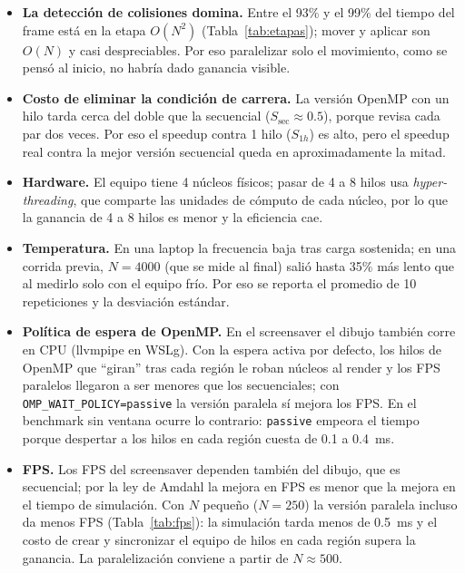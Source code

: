 \documentclass[11pt,letterpaper]{article}
\newcommand{\codigo}[1]{\texttt{#1}}
\begin{document}
\begin{itemize}
  \item \textbf{La detección de colisiones domina.} Entre el 93\% y el 99\% del tiempo del
  frame está en la etapa $O(N^2)$ (Tabla~\ref{tab:etapas}); mover y aplicar son
  $O(N)$ y casi despreciables. Por eso paralelizar solo el movimiento, como se
  pensó al inicio, no habría dado ganancia visible.
  \item \textbf{Costo de eliminar la condición de carrera.} La versión OpenMP
  con un hilo tarda cerca del doble que la secuencial ($S_{\text{sec}}\approx
  0.5$), porque revisa cada par dos veces. Por eso el speedup contra 1 hilo
  ($S_{1h}$) es alto, pero el speedup real contra la mejor versión secuencial
  queda en aproximadamente la mitad.
  \item \textbf{Hardware.} El equipo tiene 4 núcleos físicos; pasar de 4 a 8
  hilos usa \emph{hyper-threading}, que comparte las unidades de cómputo de
  cada núcleo, por lo que la ganancia de 4 a 8 hilos es menor y la eficiencia
  cae.
  \item \textbf{Temperatura.} En una laptop la frecuencia baja tras carga
  sostenida; en una corrida previa, $N=4000$ (que se mide al final) salió
  hasta 35\% más lento que al medirlo solo con el equipo frío. Por eso se
  reporta el promedio de 10 repeticiones y la desviación estándar.
  \item \textbf{Política de espera de OpenMP.} En el screensaver el dibujo
  también corre en CPU (llvmpipe en WSLg). Con la espera activa por defecto,
  los hilos de OpenMP que ``giran'' tras cada región le roban núcleos al
  render y los FPS paralelos llegaron a ser menores que los secuenciales; con
  \codigo{OMP\_WAIT\_POLICY=passive} la versión paralela sí mejora los FPS. En
  el benchmark sin ventana ocurre lo contrario: \codigo{passive} empeora el
  tiempo porque despertar a los hilos en cada región cuesta de 0.1 a 0.4~ms.
  \item \textbf{FPS.} Los FPS del screensaver dependen también del dibujo, que
  es secuencial; por la ley de Amdahl la mejora en FPS es menor que la mejora
  en el tiempo de simulación. Con $N$ pequeño ($N=250$) la versión paralela
  incluso da menos FPS (Tabla~\ref{tab:fps}): la simulación tarda menos de
  0.5~ms y el costo de crear y sincronizar el equipo de hilos en cada región
  supera la ganancia. La paralelización conviene a partir de
  $N\approx500$.
\end{itemize}

\end{document}
